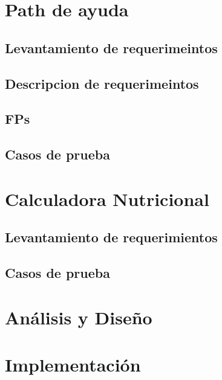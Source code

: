 \documentclass[12pt,letterpaper,spanish, xcolor=table]{report}
\begin{document}
\section{Path de ayuda}

\subsection{Levantamiento de requerimeintos}

\subsection{Descripcion de requerimeintos}

\subsection{FPs}

\subsection{Casos de prueba}



\section{Calculadora Nutricional}

\subsection{Levantamiento de requerimientos}

\subsection{Casos de prueba}













	




	
\section{Análisis y Diseño}

\section{Implementación}
\end{document}
